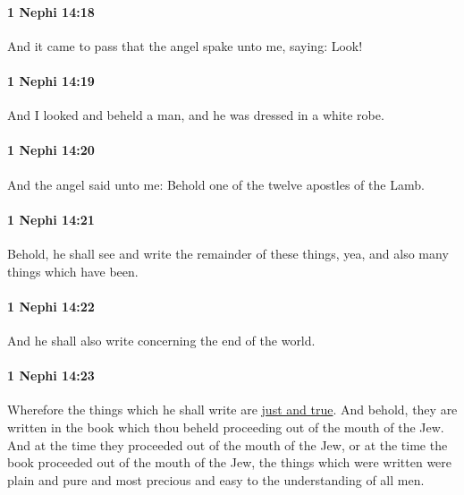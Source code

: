 		\paragraph{1 Nephi 14:18} %
			\label{1NEPHI-14-18}

			And it came to pass that the angel spake unto me, saying: Look!

		\paragraph{1 Nephi 14:19} %
			\label{1NEPHI-14-19}

			And I looked and beheld a man, and he was dressed in a white robe.

		\paragraph{1 Nephi 14:20} %
			\label{1NEPHI-14-20}

			And the angel said unto me:
			Behold one of the twelve apostles of the Lamb.

		\paragraph{1 Nephi 14:21} %
			\label{1NEPHI-14-21}

			Behold, he shall see and write the remainder of these things,
			yea, and also many things which have been.

		\paragraph{1 Nephi 14:22} %
			\label{1NEPHI-14-22}

			And he shall also write concerning the end of the world.

		\paragraph{1 Nephi 14:23} %
			\label{1NEPHI-14-23}

			Wherefore the things which he shall write are \hyperref[TRUTH-PHRASES]{just and true}.
			And behold, they are written in the book
			which thou beheld proceeding out of the mouth of the Jew.
			And at the time they proceeded out of the mouth of the Jew,
			or at the time the book proceeded out of the mouth of the Jew,
			the things which were written were plain and pure and most precious
			and easy to the understanding of all men.

